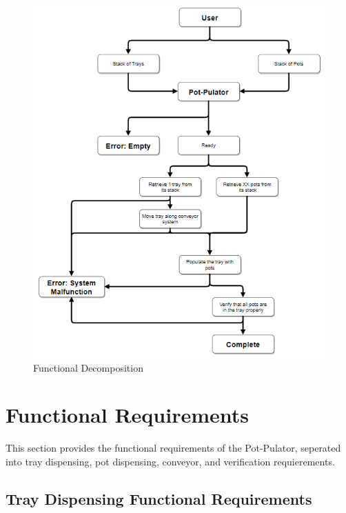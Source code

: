 \documentclass[12pt]{article}
\begin{document}
\begin{figure}[H]
  \includegraphics[width=\linewidth]{functionalDiagram.PNG}
  \caption{Functional Decomposition}
  \label{fig:functional1}
\end{figure}

  \section{Functional Requirements}

  This section provides the functional requirements of the Pot-Pulator, seperated into tray dispensing,
  pot dispensing, conveyor, and verification requierements.
 
  \subsection{Tray Dispensing Functional Requirements}
  
\end{document}
